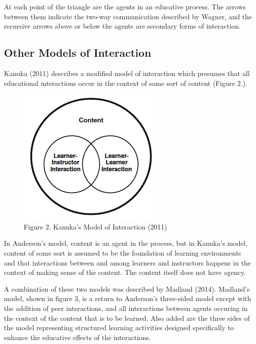 \documentclass[
]{book}
\begin{document}
At each point of the triangle are the agents in an educative process. The arrows between them indicate the two-way communication described by Wagner, and the recursive arrows above or below the agents are secondary forms of interaction.

\hypertarget{other-models-of-interaction}{%
\subsection*{Other Models of Interaction}\label{other-models-of-interaction}}

Kanuka (2011) describes a modified model of interaction which presumes that all educational interactions occur in the context of some sort of content (Figure 2.).

\begin{figure}
\centering
\includegraphics{assets/u2/Kanuka-Modes-of-Interaction.png}
\caption{Figure 2. Kanuka's Model of Interaction (2011)}
\end{figure}

In Anderson's model, content is an agent in the process, but in Kanuka's model, content of some sort is assumed to be the foundation of learning environments and that interactions between and among learners and instructors happens in the context of making sense of the content. The content itself does not have agency.

A combination of these two models was described by Madland (2014). Madland's model, shown in figure 3, is a return to Anderson's three-sided model except with the addition of peer interactions, and all interactions between agents occuring in the context of the content that is to be learned. Also added are the three sides of the model representing structured learning activities designed specifically to enhance the educative effects of the interactions.
\end{document}

